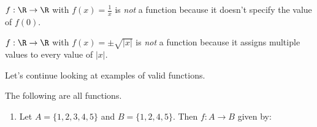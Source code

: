 \documentclass[a4paper]{scrreprt}
\begin{document}
\begin{example}
	$f: \R \rightarrow \R$ with $f(x) = \frac{1}{x}$ is \emph{not} a function because it doesn't specify the value of $f(0)$.

	$f: \R \rightarrow \R$ with $f(x) = \pm \sqrt{|x|}$ is \emph{not} a function because it assigns multiple values to every value of $|x|$.
\end{example}


Let's continue looking at examples of valid functions.

\begin{example}
	The following are all functions.
	\begin{enumerate}[label=(\roman*)]
		\item Let $A = \{1, 2, 3, 4, 5\}$ and $B = \{1, 2, 4, 5\}$. Then $f: A \rightarrow B$ given by:
		\begin{center}
			


\begin{tikzpicture}[x=0.75pt,y=0.75pt,yscale=-1,xscale=1]


\end{tikzpicture}
\end{center}
\end{enumerate}
\end{example}
\end{document}
